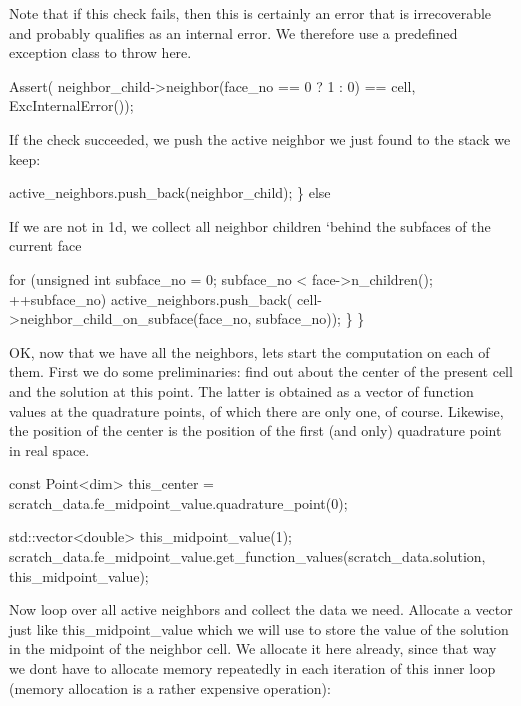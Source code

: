 Note that if this check fails, then this is certainly an error that is irrecoverable and probably qualifies as an internal error. We therefore use a predefined exception class to throw here.


\begin{DoxyCode}
Assert(
    neighbor\_child->neighbor(face\_no == 0 ? 1 : 0) == cell,
    ExcInternalError());
\end{DoxyCode}


If the check succeeded, we push the active neighbor we just found to the stack we keep\+:


\begin{DoxyCode}
    active\_neighbors.push\_back(neighbor\_child);
\} \textcolor{keywordflow}{else}
\end{DoxyCode}


If we are not in 1d, we collect all neighbor children `behind\textquotesingle{} the subfaces of the current face


\begin{DoxyCode}
            \textcolor{keywordflow}{for} (\textcolor{keywordtype}{unsigned} \textcolor{keywordtype}{int} subface\_no = 0;
                 subface\_no < face->n\_children(); ++subface\_no)
                active\_neighbors.push\_back(
                    cell->neighbor\_child\_on\_subface(face\_no,
                                                    subface\_no));
    \}
\}
\end{DoxyCode}


OK, now that we have all the neighbors, lets start the computation on each of them. First we do some preliminaries\+: find out about the center of the present cell and the solution at this point. The latter is obtained as a vector of function values at the quadrature points, of which there are only one, of course. Likewise, the position of the center is the position of the first (and only) quadrature point in real space.


\begin{DoxyCode}
\textcolor{keyword}{const} Point<dim> this\_center =
    scratch\_data.fe\_midpoint\_value.quadrature\_point(0);

std::vector<double> this\_midpoint\_value(1);
scratch\_data.fe\_midpoint\_value.get\_function\_values(scratch\_data.solution,
                                                   this\_midpoint\_value);
\end{DoxyCode}


Now loop over all active neighbors and collect the data we need. Allocate a vector just like {\ttfamily this\+\_\+midpoint\+\_\+value} which we will use to store the value of the solution in the midpoint of the neighbor cell. We allocate it here already, since that way we don\textquotesingle{}t have to allocate memory repeatedly in each iteration of this inner loop (memory allocation is a rather expensive operation)\+:


